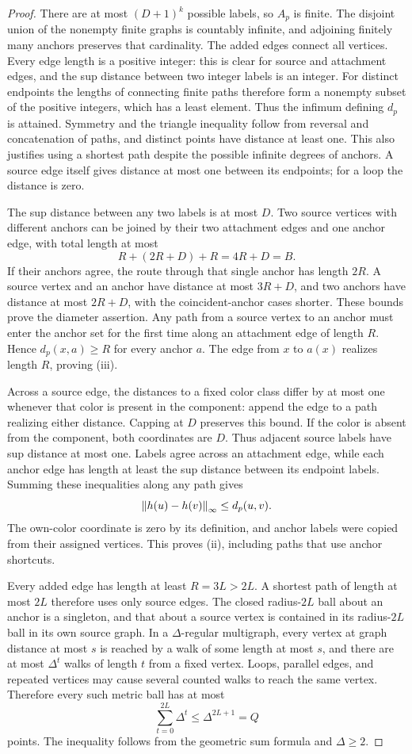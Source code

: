 \begin{proof}
There are at most $(D+1)^k$ possible labels, so $A_p$ is finite. The disjoint
union of the nonempty finite graphs is countably infinite, and adjoining
finitely many anchors preserves that cardinality. The added edges connect
all vertices. Every edge length is a positive integer: this is clear for
source and attachment edges, and the sup distance between two integer labels
is an integer. For distinct endpoints the lengths of connecting finite paths
therefore form a nonempty subset of the positive integers, which has a least
element. Thus the infimum defining $d_p$ is attained. Symmetry and the
triangle inequality follow from reversal and concatenation of paths, and
distinct points have distance at least one. This also justifies using a
shortest path despite the possible infinite degrees of anchors. A source edge
itself gives distance at most one between its endpoints; for a loop the
distance is zero.

The sup distance between any two labels is at most $D$. Two source vertices
with different anchors can be joined by their two attachment edges and one
anchor edge, with total length at most
\[
 R+(2R+D)+R=4R+D=B.
\]
If their anchors agree, the route through that single anchor has length
$2R$. A source vertex and an anchor have distance at most $3R+D$, and two
anchors have distance at most $2R+D$, with the coincident-anchor cases
shorter. These bounds prove the diameter assertion. Any path from a source
vertex to an anchor must enter the anchor set for the first time along an
attachment edge of length $R$. Hence $d_p(x,a)\ge R$ for every anchor $a$.
The edge from $x$ to $a(x)$ realizes length $R$, proving (iii).

Across a source edge, the distances to a fixed color class differ by at most
one whenever that color is present in the component: append the edge to a
path realizing either distance. Capping at $D$ preserves this bound. If the
color is absent from the component, both coordinates are $D$. Thus adjacent
source labels have sup distance at most one. Labels agree across an
attachment edge, while each anchor edge has length at least the sup distance
between its endpoint labels. Summing these inequalities along any path gives
\[
 \left\|h(u)-h(v)\right\|_\infty\le d_p(u,v).
\]
The own-color coordinate is zero by its definition, and anchor labels were
copied from their assigned vertices. This proves (ii), including paths that
use anchor shortcuts.

Every added edge has length at least $R=3L>2L$. A shortest path of length at
most $2L$ therefore uses only source edges. The closed radius-$2L$ ball about
an anchor is a singleton, and that about a source vertex is contained in its
radius-$2L$ ball in its own source graph. In a $\Delta$-regular multigraph, every vertex
at graph distance at most $s$ is reached by a walk of some length at most
$s$, and there are at most $\Delta^t$ walks of length $t$ from a fixed
vertex. Loops, parallel edges, and repeated vertices may cause several counted
walks to reach the same vertex. Therefore every such metric ball has at most
\[
 \sum_{t=0}^{2L}\Delta^t\le\Delta^{2L+1}=Q
\]
points. The inequality follows from the geometric sum formula and
$\Delta\ge2$.


\end{proof}
